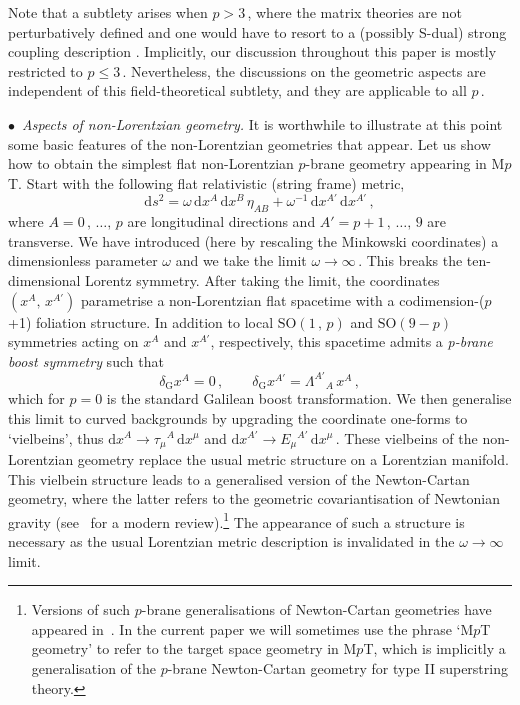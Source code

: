 \documentclass[11pt]{article}
\newcommand{\be}{\begin{equation}}
\newcommand{\ee}{\end{equation}}
\renewcommand{\emph}[1]{\textit{#1}}
\newcommand{\dd}{\mathrm{d}}
\begin{document}
Note that a subtlety arises when $p > 3$\,, where the matrix theories are not perturbatively defined and one would have to resort to a (possibly S-dual) strong coupling description \cite{Rozali:1997cb, Berkooz:1997cq, Seiberg:1997ad,Obers:1997kk}. Implicitly, our discussion throughout this paper is mostly restricted to $p \leq 3$\,. Nevertheless, the discussions on the geometric aspects are independent of this field-theoretical subtlety, and they are applicable to all $p$\,. 

\vspace{3mm}
\noindent $\bullet$~\emph{Aspects of non-Lorentzian geometry.}
It is worthwhile to illustrate at this point some basic features of the non-Lorentzian geometries that appear.
Let us show how to obtain the simplest flat non-Lorentzian $p$-brane geometry appearing in M$p$T.
Start with the following flat relativistic (string frame) metric, 
%
\be \label{intro_limit}
    \dd s^2 = \omega \, \dd x^A \, \dd x^B \, \eta^{}_{AB} + \omega^{-1} \, \dd x^{A'} \, \dd x^{A'}\,,
\ee
%
where $A=0\,, \, \dots, \, p$ are longitudinal directions and $A' = p+1\,, \, \dots, \, 9$ are transverse.
We have introduced (here by rescaling the Minkowski coordinates) a dimensionless parameter $\omega$ and we take the limit $\omega \rightarrow \infty$\,. 
This breaks the ten-dimensional Lorentz symmetry.
After taking the limit, the coordinates $(x^A, \,x^{A'})$ parametrise a non-Lorentzian flat spacetime with a codimension-($p$+1) foliation structure.
In addition to local $\mathrm{SO}(1\,,\,p)$ and $\mathrm{SO}(9-p)$ symmetries acting on $x^A$ and $x^{A'}$, respectively, this spacetime admits a \emph{p-brane boost symmetry} such that
%
\be \label{intro_boost}
    \delta^{}_\text{G} x^A = 0 \,,
        \qquad%
    \delta^{}_\text{G} x^{A'} = \Lambda^{A'}{}_{\!A} \, x^A \,,
\ee
%
which for $p=0$ is the standard Galilean boost transformation.
We then generalise this limit to curved backgrounds by upgrading the coordinate one-forms to `vielbeins', thus $\dd x^A \rightarrow \tau^{}_\mu{}^A \, \dd x^\mu$ and $\dd x^{A'} \rightarrow E^{}_\mu{}^{A'} \, \dd x^\mu$\,.
These vielbeins of the non-Lorentzian geometry replace the usual metric structure on a Lorentzian manifold. 
This vielbein structure leads to a generalised version of the Newton-Cartan geometry, where the latter refers to the geometric covariantisation of Newtonian gravity (see~\cite{Hartong:2022lsy} for a modern review).\footnote{Versions of such $p$-brane generalisations of Newton-Cartan geometries have appeared in~\cite{Kluson:2017abm,Pereniguez:2019eoq, Blair:2021waq, Ebert:2021mfu, Novosad:2021tlq, Bergshoeff:2023rkk, Ebert:2023hba,Bergshoeff:2024ipq}. In the current paper we will sometimes use the phrase `M$p$T geometry' to refer to the target space geometry in M$p$T, which is implicitly a generalisation of the $p$-brane Newton-Cartan geometry for type II superstring theory.} The appearance of such a structure is necessary as the usual Lorentzian metric description is invalidated in the $\omega \rightarrow \infty$ limit. 
\end{document}
